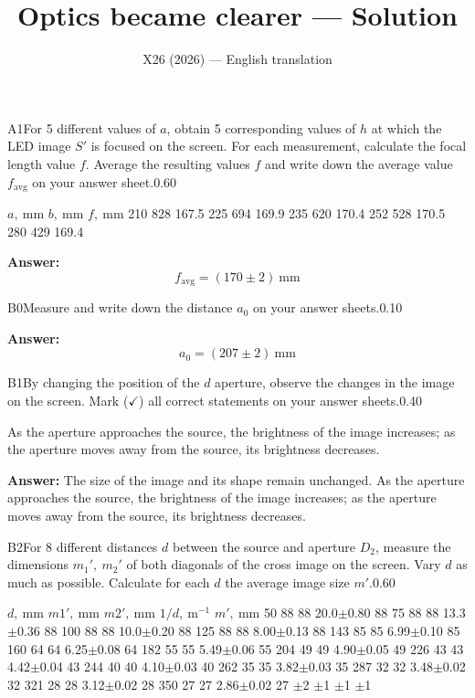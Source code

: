 \documentclass[11pt,a4paper]{article}
\title{\textbf{Optics became clearer --- Solution}}
\author{\normalsize X26 (2026) — English translation}
\date{}
\begin{document}
\maketitle\vspace{-0.5em}
\begin{solcard}{A1}{For 5 different values of $a$, obtain 5 corresponding values of $h$ at which the LED image $S'$ is focused on the screen. For each measurement, calculate the focal length value $f$. Average the resulting values $f$ and write down the average value $f_\text{avg}$ on your answer sheet.}{0.60}

$a,~\mathrm{mm}$ $b,~\mathrm{mm}$ $f,~\mathrm{mm}$ 210 828 167.5 225 694 169.9 235 620 170.4 252 528 170.5 280 429 169.4

\par\smallskip\noindent\textbf{Answer:} $$f_\text{avg} = (170\pm2)~\mathrm{mm}$$
\end{solcard}

\begin{solcard}{B0}{Measure and write down the distance $a_0$ on your answer sheets.}{0.10}
\par\smallskip\noindent\textbf{Answer:} $$a_0 = (207\pm2)~\mathrm{mm}$$
\end{solcard}

\begin{solcard}{B1}{By changing the position of the $d$ aperture, observe the changes in the image on the screen. Mark ($\checkmark$) all correct statements on your answer sheets.}{0.40}

As the aperture approaches the source, the brightness of the image increases; as the aperture moves away from the source, its brightness decreases.

\par\smallskip\noindent\textbf{Answer:} The size of the image and its shape remain unchanged. As the aperture approaches the source, the brightness of the image increases; as the aperture moves away from the source, its brightness decreases.
\end{solcard}

\begin{solcard}{B2}{For 8 different distances $d$ between the source and aperture $D_2$, measure the dimensions $m_1',~m_2'$ of both diagonals of the cross image on the screen. Vary $d$ as much as possible. Calculate for each $d$ the average image size $m'$.}{0.60}

$d,~\mathrm{mm}$ $m1',~\mathrm{mm}$ $m2',~\mathrm{mm}$ $1/d,~\mathrm{m}^{-1}$ $m',~\mathrm{mm}$ 50 88 88 20.0$±$0.80 88 75 88 88 13.3$±$0.36 88 100 88 88 10.0$±$0.20 88 125 88 88 8.00$±$0.13 88 143 85 85 6.99$±$0.10 85 160 64 64 6.25$±$0.08 64 182 55 55 5.49$±$0.06 55 204 49 49 4.90$±$0.05 49 226 43 43 4.42$±$0.04 43 244 40 40 4.10$±$0.03 40 262 35 35 3.82$±$0.03 35 287 32 32 3.48$±$0.02 32 321 28 28 3.12$±$0.02 28 350 27 27 2.86$±$0.02 27 $\pm$2 $\pm$1 $\pm$1 $\pm$1

\end{solcard}
\end{document}
